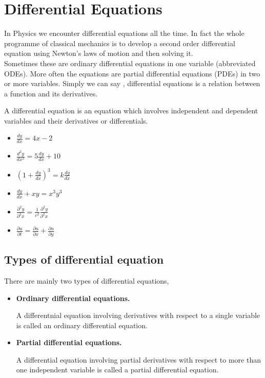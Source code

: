 \chapter{Differential Equations}
In Physics we encounter differential equations all the time. In fact the whole programme of classical mechanics is to develop a second order differential equation using Newton's laws of motion and then solving it.\\Sometimes these are ordinary
differential equations in one variable (abbreviated ODEs). More often the equations are
partial differential equations (PDEs) in two or more variables. Simply we can say , differential equations is a relation between a function and its derivatives.
\begin{definition}
	A differential equation is an equation which involves independent and dependent variables and their derivatives or differentials.
\end{definition}
\begin{example}
	\hspace{1cm}
\begin{itemize}
		\item $\frac{dy}{dx}={4x-2}$
		\item $\frac{d^{2}y}{dx^{2}}=5\frac{dy}{dx}+10$
		\item $(1+\frac{dy}{dx})^{3}=k\frac{dy}{dx}$
		\item $\frac{dy}{dx}+xy=x^{3}y^{3}$
		\item $\frac{\partial^{2}y}{\partial^{2} x}=\frac{1}{c^{2}} \frac{\partial^{2}y}{\partial^{2} x} $
		\item $\frac{\partial u}{\partial t}=\frac{\partial u}{\partial x}+\frac{\partial u}{\partial y}$
	\end{itemize}
\end{example}
\section{{Types of differential equation}}
There are mainly two types of differential equations,
	\begin{itemize}
	\item \textbf{Ordinary differential equations.}\par A differentnial equation involving derivatives with respect to a single variable is called an ordinary differential equation. 
	\item \textbf{Partial differential equations.}\par A differential equation involving partial derivatives with respect to more than one independent variable is called a partial differential equation.
	\end{itemize}
